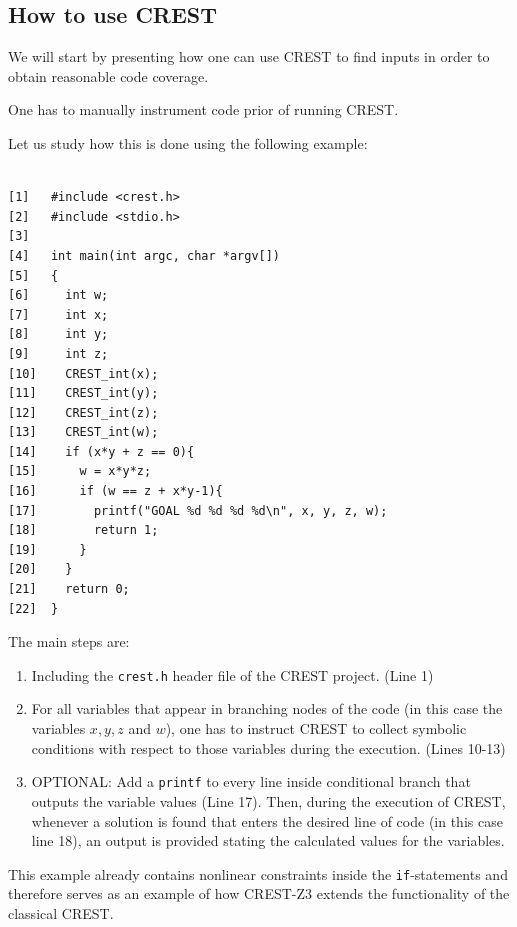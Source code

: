 \documentclass[oribibl]{llncs}
\begin{document}
\subsection{How to use \textsc{CREST}}
We will start by presenting how one can use \textsc{CREST} to find
inputs in order to obtain reasonable code coverage.

One has to manually instrument code prior of running \textsc{CREST}.

Let us study how this is done using the following example:

\begin{example}
\label{ex:codeForDemo}
\begin{verbatim}

[1]   #include <crest.h>
[2]   #include <stdio.h>
[3]  
[4]   int main(int argc, char *argv[])
[5]   {
[6]     int w;
[7]     int x;
[8]     int y;
[9]     int z;
[10]    CREST_int(x);
[11]    CREST_int(y);
[12]    CREST_int(z);
[13]    CREST_int(w);
[14]    if (x*y + z == 0){
[15]      w = x*y*z;
[16]      if (w == z + x*y-1){
[17]        printf("GOAL %d %d %d %d\n", x, y, z, w);
[18]        return 1;
[19]      }
[20]    }	
[21]    return 0;
[22]  }
\end{verbatim}
\end{example}

The main steps are:
\begin{enumerate}
  \item Including the \texttt{crest.h} header file of the
    \textsc{CREST} project. (Line 1)
   \item For all variables that appear in branching nodes of the code
     (in this case the variables $x,y,z$ and $w$), one has to instruct
     \textsc{CREST} to collect symbolic conditions with respect to
     those variables during the
     execution. (Lines 10-13)
   \item OPTIONAL: Add a
     \texttt{printf} to every line inside conditional branch that
     outputs the variable values (Line 17). Then, during the execution of
     \textsc{CREST}, whenever a solution is found that enters the
     desired line of code (in this case line 18), an output is
     provided stating the calculated values for the variables.
\end{enumerate}

\begin{remark}
  This example already contains nonlinear constraints inside the
  \texttt{if}-statements and therefore serves as an example of how
  \textsc{CREST-Z3} extends the functionality of the classical \textsc{CREST}.
\end{remark}
\end{document}
